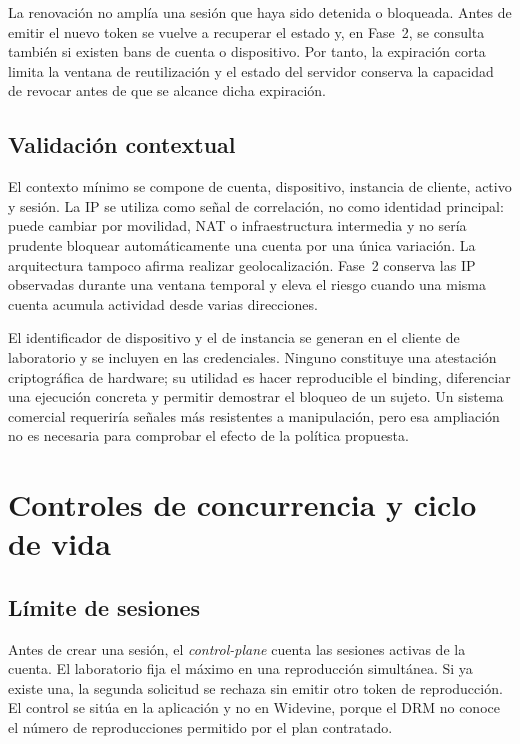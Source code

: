 La renovación no amplía una sesión que haya sido detenida o bloqueada. Antes de emitir el nuevo token se vuelve a recuperar el estado y, en Fase~2, se consulta también si existen bans de cuenta o dispositivo. Por tanto, la expiración corta limita la ventana de reutilización y el estado del servidor conserva la capacidad de revocar antes de que se alcance dicha expiración.

\subsection{Validación contextual}

El contexto mínimo se compone de cuenta, dispositivo, instancia de cliente, activo y sesión. La IP se utiliza como señal de correlación, no como identidad principal: puede cambiar por movilidad, NAT o infraestructura intermedia y no sería prudente bloquear automáticamente una cuenta por una única variación. La arquitectura tampoco afirma realizar geolocalización. Fase~2 conserva las IP observadas durante una ventana temporal y eleva el riesgo cuando una misma cuenta acumula actividad desde varias direcciones.

El identificador de dispositivo y el de instancia se generan en el cliente de laboratorio y se incluyen en las credenciales. Ninguno constituye una atestación criptográfica de hardware; su utilidad es hacer reproducible el binding, diferenciar una ejecución concreta y permitir demostrar el bloqueo de un sujeto. Un sistema comercial requeriría señales más resistentes a manipulación, pero esa ampliación no es necesaria para comprobar el efecto de la política propuesta.

\section{Controles de concurrencia y ciclo de vida}

\subsection{Límite de sesiones}

Antes de crear una sesión, el \textit{control-plane} cuenta las sesiones activas de la cuenta. El laboratorio fija el máximo en una reproducción simultánea. Si ya existe una, la segunda solicitud se rechaza sin emitir otro token de reproducción. El control se sitúa en la aplicación y no en Widevine, porque el DRM no conoce el número de reproducciones permitido por el plan contratado.

